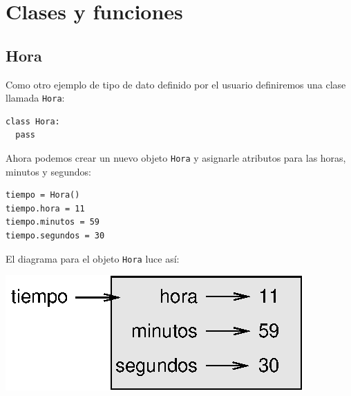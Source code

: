 


\chapter{Clases y funciones}
\label{time}


\section{Hora}

Como otro ejemplo de tipo de dato definido por el usuario definiremos
una clase llamada \texttt{Hora}:

\beforeverb
\begin{verbatim}
class Hora:
  pass
\end{verbatim}
\afterverb
%
Ahora podemos crear un nuevo objeto \texttt{Hora} y asignarle atributos
para las horas, minutos y segundos:

\beforeverb
\begin{verbatim}
tiempo = Hora()
tiempo.hora = 11
tiempo.minutos = 59
tiempo.segundos = 30
\end{verbatim}
\afterverb
%
El diagrama para el objeto \texttt{Hora} luce así:

\beforefig
\centerline{\includegraphics{illustrations/time.eps}}
\afterfig


